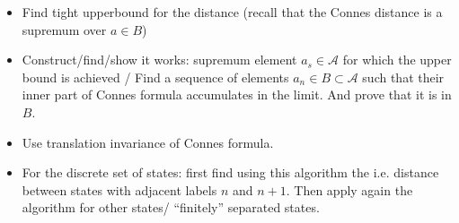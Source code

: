 \documentclass{article}
\begin{document}
\begin{itemize}
\begin{itemize}
\begin{itemize}
            \item Find tight upperbound for the distance (recall that the Connes distance is a supremum over $a \in B$)
            
            \item Construct/find/show it works: supremum element $a_s \in \mathcal A$ for which the upper bound is achieved / Find a sequence of elements $a_n \in B \subset \mathcal A$ such that their inner part of Connes formula accumulates in the limit. And prove that it is in $B$.
            
            \item Use translation invariance of Connes formula.
            
            \item For the discrete set of states: first find using this algorithm the  i.e. distance between states with adjacent labels $n$ and $n+1$. Then apply again the algorithm for other states/ ``finitely'' separated states.
                
            \end{itemize}
            
        \end{itemize}
    
    \end{itemize}


%

%

%

%

%
\end{document}
